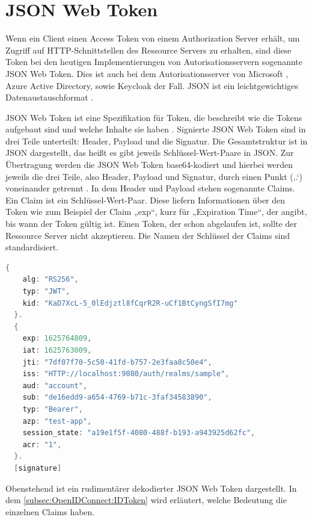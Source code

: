 \section{JSON Web Token}
\label{sec:JSONWebToken}
Wenn ein Client einen Access Token von einem Authorization Server erhält, um Zugriff auf HTTP-Schnittstellen des Ressource Servers zu erhalten, sind diese Token bei den heutigen Implementierungen von Autorisationsservern sogenannte \ac{JSON} Web Token. Dies ist auch bei dem Autorisationsserver von Microsoft \citep{azuread:2021}, Azure Active Directory, sowie Keycloak \citep{keycloak:2021} der Fall. \ac{JSON} ist ein leichtgewichtiges Datenaustauschformat \citep{json:2006}.\smallskip

JSON Web Token ist eine Spezifikation für Token, die beschreibt wie die Tokens aufgebaut sind und welche Inhalte sie haben \citep{jwt:2015}.
Signierte JSON Web Token sind in drei Teile unterteilt: Header, Payload und die Signatur. Die Gesamtstruktur ist in JSON dargestellt, das heißt es gibt jeweils Schlüssel-Wert-Paare in JSON. Zur Übertragung werden die JSON Web Token base64-kodiert und hierbei werden jeweils die drei Teile, also Header, Payload und Signatur, durch einen Punkt (‚.‘) voneinander getrennt \citep{jwt:2015}. 
In dem Header und Payload stehen sogenannte Claims. Ein Claim ist ein Schlüssel-Wert-Paar. Diese liefern Informationen über den Token wie zum Beispiel der Claim „exp“, kurz für „Expiration Time“, der angibt, bis wann der Token gültig ist. Einen Token, der schon abgelaufen ist, sollte der Ressource Server nicht akzeptieren. Die Namen der Schlüssel der Claims sind standardisiert. 

\begin{lstlisting}[language=C++,frame=tb,caption={Beispiel JSON Web Token},label=lst:BeispielJSONWebToken]
  {
    alg: "RS256",
    typ: "JWT",
    kid: "KaD7XcL-5_0lEdjztl8fCqrR2R-uCf1BtCyngSfI7mg"
  }.
  {
    exp: 1625764809,
    iat: 1625763009,
    jti: "7df07f70-5c50-41fd-b757-2e3faa8c50e4",
    iss: "HTTP://localhost:9080/auth/realms/sample",
    aud: "account",
    sub: "de16edd9-a654-4769-b71c-3faf34583890",
    typ: "Bearer",
    azp: "test-app",
    session_state: "a19e1f5f-4080-488f-b193-a943925d62fc",
    acr: "1",
  }.
  [signature]   
\end{lstlisting}
\bigskip

Obenstehend ist ein rudimentärer dekodierter JSON Web Token dargestellt. In dem \autoref{subsec:OpenIDConnect:IDToken}
wird erläutert, welche Bedeutung die einzelnen Claims haben.

